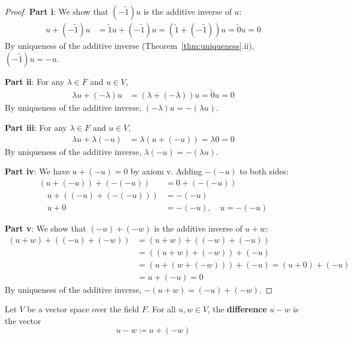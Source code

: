 \begin{proof}
    \textbf{Part i}: We show that $(-\tilde{1})u$ is the additive inverse of $u$:
    \begin{align*}
        u + (-\tilde{1})u &= \tilde{1}u + (-\tilde{1})u = (\tilde{1} + (-\tilde{1}))u = \tilde{0}u = 0 
    \end{align*}
    By uniqueness of the additive inverse (Theorem~\ref{thm:uniqueness}.ii), $(-\tilde{1})u = -u$.
    
    \textbf{Part ii}: For any $\lambda \in F$ and $u \in V$,
    \begin{align*}
        \lambda u + (-\lambda)u &= (\lambda + (-\lambda))u = \tilde{0}u = 0 
    \end{align*}
    By uniqueness of the additive inverse, $(-\lambda)u = -(\lambda u)$.
    
    \textbf{Part iii}: For any $\lambda \in F$ and $u \in V$,
    \begin{align*}
        \lambda u + \lambda(-u) &= \lambda(u + (-u)) = \lambda 0 = 0 
    \end{align*}
    By uniqueness of the additive inverse, $\lambda(-u) = -(\lambda u)$.
    
    \textbf{Part iv}: We have $u + (-u) = 0$ by axiom v. Adding $-(-u)$ to both sides:
    \begin{align*}
        (u + (-u)) + (-(-u)) &= 0 + (-(-u)) \\ \quad u + ((-u) + (-(-u))) &= -(-u) \\ \quad u + 0 &= -(-u), \quad u = -(-u)
    \end{align*}
    
    \textbf{Part v}: We show that $(-u) + (-w)$ is the additive inverse of $u + w$:
    \begin{align*}
        (u + w) + ((-u) + (-w)) &= (u + w) + ((-w) + (-u)) \\
        &= ((u + w) + (-w)) + (-u) \\
        &= (u + (w + (-w))) + (-u) = (u + 0) + (-u) \\
        &= u + (-u) =0
    \end{align*}
    By uniqueness of the additive inverse, $-(u + w) = (-u) + (-w)$.
\end{proof}

\begin{definition}[Subtraction]\label{def:subtraction}
    Let $V$ be a vector space over the field $F$. For all $u, w \in V$, the \textbf{difference} $u - w$ is the vector
    \[
    u - w \coloneqq u + (-w)
    \]
\end{definition}


